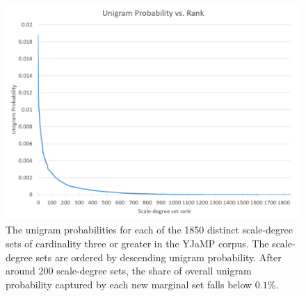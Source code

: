 \begin{figure}
	\centering
	\includegraphics[width=6in]{lexicon_zipfian.png}
	\caption{The unigram probabilities for each of the 1850 distinct scale-degree sets of cardinality three or greater in the YJaMP corpus.  The scale-degree sets are ordered by descending unigram probability.  After around 200 scale-degree sets, the share of overall unigram probability captured by each new marginal set falls below $0.1\%$.}
	\label{lexicon}
\end{figure}

